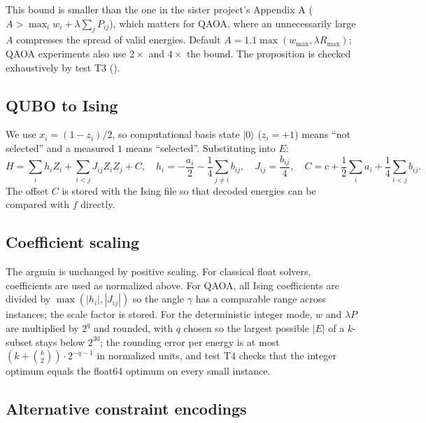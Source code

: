 This bound is smaller than the one in the sister project's Appendix A ($A>\max_iw_i+\lambda\sum_jP_{ij}$), which matters for QAOA, where an unnecessarily large $A$ compresses the spread of valid energies. Default $A=1.1\max(w_{\max},\lambda R_{\max})$; QAOA experiments also use $2\times$ and $4\times$ the bound. The proposition is checked exhaustively by test T3 ().

\subsection{QUBO to Ising}

We use $x_i=(1-z_i)/2$, so computational basis state $|0\rangle$ ($z_i=+1$) means ``not selected'' and a measured $1$ means ``selected''. Substituting into $E$:
\begin{equation}
H=\sum_i h_iZ_i+\sum_{i<j}J_{ij}Z_iZ_j+C,\quad h_i=-\frac{a_i}{2}-\frac{1}{4}\sum_{j\ne i}b_{ij},\quad J_{ij}=\frac{b_{ij}}{4},\quad C=c+\frac{1}{2}\sum_ia_i+\frac{1}{4}\sum_{i<j}b_{ij}.
\end{equation}
The offset $C$ is stored with the Ising file so that decoded energies can be compared with $f$ directly.

\subsection{Coefficient scaling}

The argmin is unchanged by positive scaling. For classical float solvers, coefficients are used as normalized above. For QAOA, all Ising coefficients are divided by $\max(|h_i|,|J_{ij}|)$ so the angle $\gamma$ has a comparable range across instances; the scale factor is stored. For the deterministic integer mode, $w$ and $\lambda P$ are multiplied by $2^{q}$ and rounded, with $q$ chosen so the largest possible $|E|$ of a $k$-subset stays below $2^{30}$; the rounding error per energy is at most $(k+\binom{k}{2})\cdot 2^{-q-1}$ in normalized units, and test T4 checks that the integer optimum equals the float64 optimum on every small instance.

\subsection{Alternative constraint encodings}

